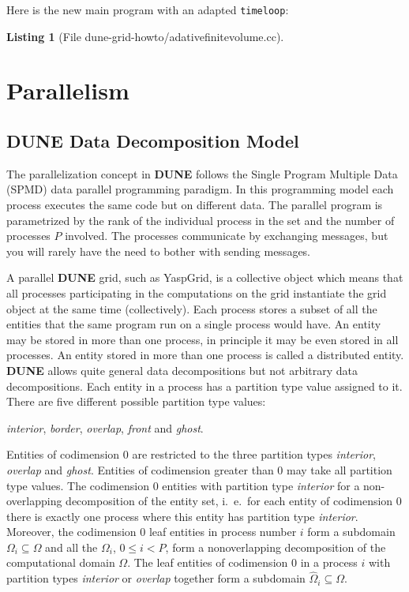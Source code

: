\documentclass[11pt,a4paper,headinclude,footinclude,DIV16,normalheadings]{scrreprt}
\newcommand{\Dune}{{\sf\bfseries DUNE}}
\newtheorem{lst}{Listing}
\begin{document}
Here is the new main program with an adapted \lstinline!timeloop!:

\begin{lst}[File dune-grid-howto/adativefinitevolume.cc] \mbox{}
\nopagebreak

\end{lst}


\chapter{Parallelism}

\section{\texorpdfstring{\Dune{}}{DUNE} Data Decomposition Model}

The parallelization concept in \Dune{} follows the Single Program
Multiple Data (SPMD) data parallel programming paradigm. In this
programming model each process executes the same code but on different
data. The parallel program is parametrized
by the rank of the individual process in the set and the number of
processes $P$
involved. The processes communicate by exchanging messages, but you
will rarely have the need to bother with sending messages.

A parallel \Dune{} grid, such as YaspGrid, is a collective object which
means that all processes participating in the computations on the grid
instantiate the grid object at the same time (collectively). Each
process stores a subset of all the entities that the same program run on a
single process would have. An entity may be stored in more
than one process, in principle it may be even stored in all
processes. An entity
stored in more than one process is called a distributed entity. \Dune{}
allows quite general data decompositions but not arbitrary data
decompositions. Each entity in a process has a partition type
value assigned to it. There are five different possible partition type
values:
\begin{center}
\textit{interior}, \textit{border}, \textit{overlap},
  \textit{front} and \textit{ghost}.
\end{center}

Entities of codimension 0 are restricted to the three partition types
\textit{interior}, \textit{overlap} and \textit{ghost}. Entities of
codimension greater than 0 may take all partition type values. 
The codimension 0 entities with partition type \textit{interior} for a
non-overlapping decomposition of the entity set, i.~e.~for each
entity of codimension 0 there is exactly one process where this entity
has partition type \textit{interior}.
Moreover, the codimension 0 leaf entities in process number $i$ form a
subdomain $\Omega_i\subseteq\Omega$ and all the $\Omega_i$, $0\leq i <
P$, form a nonoverlapping decomposition of the computational domain
$\Omega$. The leaf entities of codimension 0 in a process $i$ with
partition types \textit{interior} or \textit{overlap} together form a
subdomain $\hat{\Omega}_i\subseteq\Omega$.
\end{document}
